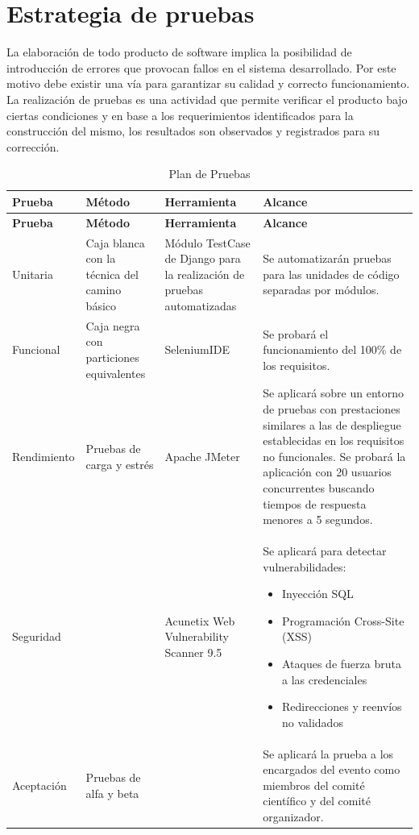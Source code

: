 \section{Estrategia de pruebas}

La elaboración de todo producto de software implica la posibilidad de introducción de errores que provocan fallos en el sistema desarrollado. Por este motivo debe existir una vía para garantizar su calidad y correcto funcionamiento. La realización de pruebas es una actividad que permite verificar el producto bajo ciertas condiciones y en base a los requerimientos identificados para la construcción del mismo, los resultados son observados y registrados para su corrección.

\begin{longtable}{|p{2.5cm}|p{3cm}|p{3cm}|p{6cm}|}
	\caption{Plan de Pruebas} \label{tab:plan-pruebas} \\
	\hline
	\textbf{Prueba} & \textbf{Método} & \textbf{Herramienta} & \textbf{Alcance} \\
	\hline
	\endfirsthead
	
	\hline
	\textbf{Prueba} & \textbf{Método} & \textbf{Herramienta} & \textbf{Alcance} \\
	\hline
	\endhead
	
	Unitaria & Caja blanca con la técnica del camino básico & Módulo TestCase de Django para la realización de pruebas automatizadas & Se automatizarán pruebas para las unidades de código separadas por módulos. \\
	\hline
	Funcional & Caja negra con particiones equivalentes & SeleniumIDE & Se probará el funcionamiento del 100\% de los requisitos. \\
	\hline
	Rendimiento & Pruebas de carga y estrés & Apache JMeter & Se aplicará sobre un entorno de pruebas con prestaciones similares a las de despliegue establecidas en los requisitos no funcionales. Se probará la aplicación con 20 usuarios concurrentes buscando tiempos de respuesta menores a 5 segundos. \\
	\hline
	Seguridad &  & Acunetix Web Vulnerability Scanner 9.5 & Se aplicará para detectar vulnerabilidades:
	\begin{itemize}[left=0pt]
		\item Inyección SQL
		\item Programación Cross-Site (XSS)
		\item Ataques de fuerza bruta a las credenciales
		\item Redirecciones y reenvíos no validados
	\end{itemize} \\
	\hline
	Aceptación & Pruebas de alfa y beta &  & Se aplicará la prueba a los encargados del evento como miembros del comité científico y del comité organizador. \\
	\hline
\end{longtable}

